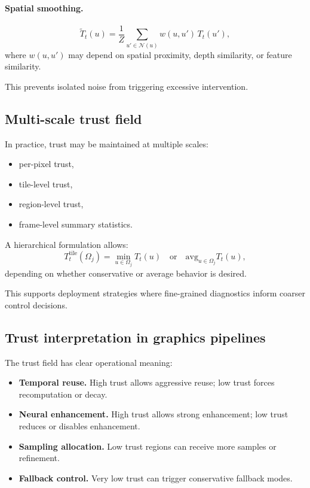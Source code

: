 \documentclass[11pt,letterpaper]{article}
\theoremstyle{gcresult}
\theoremstyle{definition}
\begin{document}
\paragraph{Spatial smoothing.}
\begin{equation}
\tilde T_t(u)=
\frac{1}{Z}\sum_{u'\in\mathcal{N}(u)} w(u,u')\,T_t(u'),
\end{equation}
where $w(u,u')$ may depend on spatial proximity, depth similarity, or feature similarity.

This prevents isolated noise from triggering excessive intervention.


\subsection{Multi-scale trust field}

In practice, trust may be maintained at multiple scales:
\begin{itemize}[leftmargin=1.5em]
    \item per-pixel trust,
    \item tile-level trust,
    \item region-level trust,
    \item frame-level summary statistics.
\end{itemize}

A hierarchical formulation allows:
\begin{equation}
T^{\mathrm{tile}}_t(\Omega_j)=\min_{u\in\Omega_j} T_t(u)
\quad \text{or} \quad
\mathrm{avg}_{u\in\Omega_j} T_t(u),
\end{equation}
depending on whether conservative or average behavior is desired.

This supports deployment strategies where fine-grained diagnostics inform coarser control decisions.


\subsection{Trust interpretation in graphics pipelines}

The trust field has clear operational meaning:

\begin{itemize}[leftmargin=1.5em]
    \item \textbf{Temporal reuse.} High trust allows aggressive reuse; low trust forces recomputation or decay.
    \item \textbf{Neural enhancement.} High trust allows strong enhancement; low trust reduces or disables enhancement.
    \item \textbf{Sampling allocation.} Low trust regions can receive more samples or refinement.
    \item \textbf{Fallback control.} Very low trust can trigger conservative fallback modes.
\end{itemize}
\end{document}
